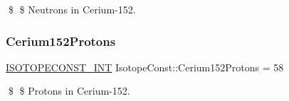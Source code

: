\$ \$ Neutrons in Cerium-\/152. \mbox{\label{group___isotope_const-_cerium-_ce152_gaf543d4c42a113fc2ee9cfef3d454430c}} 
\subsubsection{\texorpdfstring{Cerium152\+Protons}{Cerium152Protons}}
{\footnotesize\ttfamily \mbox{\hyperlink{group___isotope_const-_macros_ga5f18360b3e99483a35c32d789e62621c}{I\+S\+O\+T\+O\+P\+E\+C\+O\+N\+S\+T\+\_\+\+I\+NT}} Isotope\+Const\+::\+Cerium152\+Protons = 58}

\$ \$ Protons in Cerium-\/152. 